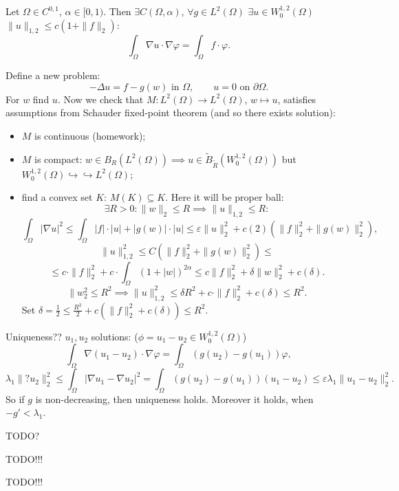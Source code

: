\documentclass[12pt]{article}					%
\begin{document}
\begin{lemma}
	Let $Ω \in C^{0, 1}$, $α \in [0, 1)$. Then $\exists C(Ω, α)$, $\forall g \in L^2(Ω)$ $\exists u \in W_0^{1, 2}(Ω)$ $\|u\|_{1, 2} ≤ c(1 + \|f\|_2)$:
	$$ \int_Ω \nabla u · \nabla φ = \int_Ω f·φ. $$

	\begin{dukazin}
		Define a new problem:
		$$ - Δu = f - g(w) \text{ in } Ω, \qquad u = 0 \text{ on } \partial Ω. $$
		For $w$ find $u$. Now we check that $M: L^2(Ω) \rightarrow L^2(Ω)$, $w \mapsto u$, satisfies assumptions from Schauder fixed-point theorem (and so there exists solution):

		\begin{itemize}
			\item $M$ is continuous (homework);
			\item $M$ is compact: $w \in B_R(L^2(Ω)) \implies u \in \tilde B_{\tilde R}(W_0^{1, 2}(Ω))$ but $W_0^{1, 2}(Ω) \hookrightarrow \hookrightarrow L^2(Ω)$;
			\item find a convex set $K$: $M(K) \subseteq K$. Here it will be proper ball:
				$$ \exists R > 0: \|w\|_2 ≤ R \implies \|u\|_{1, 2} ≤ R: $$
				$$ \int_Ω |\nabla u|^2 ≤ \int_Ω |f|·|u| + |g(w)|·|u| ≤ ε\|u\|_2^2 + c(2)(\|f\|_2^2 + \|g(w)\|_2^2), $$
				$$ \|u\|_{1, 2}^2 ≤ C(\|f\|_2^2 + \|g(w)\|_2^2) ≤ $$
				$$ ≤ c·\|f\|_2^2 + c·\int_Ω (1 + |w|)^{2α} ≤ c\|f\|_2^2 + \delta \|w\|_2^2 + c(δ). $$
				$$ \|w_2^2 ≤ R^2 \implies \|u\|_{1, 2}^2 ≤ \delta R^2 + c·\|f\|_2^2 + c(δ) ≤ R^2. $$
				Set $δ = \frac{1}{2} ≤ \frac{R^2}{2} + c(\|f\|_2^2 + c(δ)) ≤ R^2$.
		\end{itemize}

		Uniqueness?? $u_1, u_2$ solutions: ($\phi = u_1 - u_2 \in W_0^{1, 2}(\Omega)$)
		$$ \int_Ω \nabla (u_1 - u_2)·\nabla φ = \int_Ω (g(u_2) - g(u_1)) φ, $$
		$$ \lambda_1 \|? u_2\|_2^2 ≤ \int_Ω |\nabla u_1 - \nabla u_2|^2 = \int_Ω(g(u_2) - g(u_1))(u_1 - u_2) ≤ ελ_1 \|u_1 - u_2\|_2^2. $$
		So if $g$ is non-decreasing, then uniqueness holds. Moreover it holds, when $-g' < \lambda_1$.
	\end{dukazin}
\end{lemma}

TODO? %


TODO!!!


TODO!!!
\end{document}
